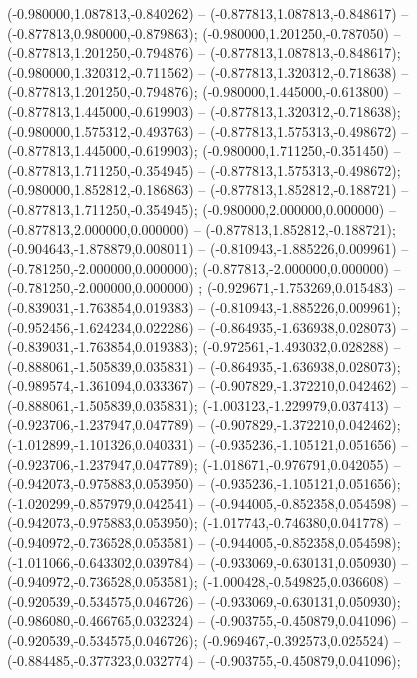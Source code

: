  (-0.980000,1.087813,-0.840262) -- (-0.877813,1.087813,-0.848617) -- (-0.877813,0.980000,-0.879863);
 (-0.980000,1.201250,-0.787050) -- (-0.877813,1.201250,-0.794876) -- (-0.877813,1.087813,-0.848617);
 (-0.980000,1.320312,-0.711562) -- (-0.877813,1.320312,-0.718638) -- (-0.877813,1.201250,-0.794876);
 (-0.980000,1.445000,-0.613800) -- (-0.877813,1.445000,-0.619903) -- (-0.877813,1.320312,-0.718638);
 (-0.980000,1.575312,-0.493763) -- (-0.877813,1.575313,-0.498672) -- (-0.877813,1.445000,-0.619903);
 (-0.980000,1.711250,-0.351450) -- (-0.877813,1.711250,-0.354945) -- (-0.877813,1.575313,-0.498672);
 (-0.980000,1.852812,-0.186863) -- (-0.877813,1.852812,-0.188721) -- (-0.877813,1.711250,-0.354945);
 (-0.980000,2.000000,0.000000) -- (-0.877813,2.000000,0.000000) -- (-0.877813,1.852812,-0.188721);
 (-0.904643,-1.878879,0.008011) -- (-0.810943,-1.885226,0.009961) -- (-0.781250,-2.000000,0.000000);
 (-0.877813,-2.000000,0.000000) -- (-0.781250,-2.000000,0.000000) ;
 (-0.929671,-1.753269,0.015483) -- (-0.839031,-1.763854,0.019383) -- (-0.810943,-1.885226,0.009961);
 (-0.952456,-1.624234,0.022286) -- (-0.864935,-1.636938,0.028073) -- (-0.839031,-1.763854,0.019383);
 (-0.972561,-1.493032,0.028288) -- (-0.888061,-1.505839,0.035831) -- (-0.864935,-1.636938,0.028073);
 (-0.989574,-1.361094,0.033367) -- (-0.907829,-1.372210,0.042462) -- (-0.888061,-1.505839,0.035831);
 (-1.003123,-1.229979,0.037413) -- (-0.923706,-1.237947,0.047789) -- (-0.907829,-1.372210,0.042462);
 (-1.012899,-1.101326,0.040331) -- (-0.935236,-1.105121,0.051656) -- (-0.923706,-1.237947,0.047789);
 (-1.018671,-0.976791,0.042055) -- (-0.942073,-0.975883,0.053950) -- (-0.935236,-1.105121,0.051656);
 (-1.020299,-0.857979,0.042541) -- (-0.944005,-0.852358,0.054598) -- (-0.942073,-0.975883,0.053950);
 (-1.017743,-0.746380,0.041778) -- (-0.940972,-0.736528,0.053581) -- (-0.944005,-0.852358,0.054598);
 (-1.011066,-0.643302,0.039784) -- (-0.933069,-0.630131,0.050930) -- (-0.940972,-0.736528,0.053581);
 (-1.000428,-0.549825,0.036608) -- (-0.920539,-0.534575,0.046726) -- (-0.933069,-0.630131,0.050930);
 (-0.986080,-0.466765,0.032324) -- (-0.903755,-0.450879,0.041096) -- (-0.920539,-0.534575,0.046726);
 (-0.969467,-0.392573,0.025524) -- (-0.884485,-0.377323,0.032774) -- (-0.903755,-0.450879,0.041096);
